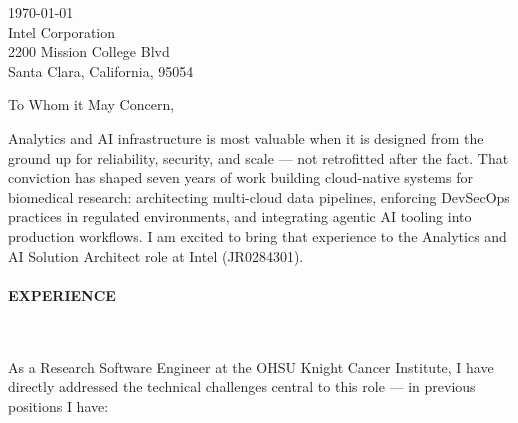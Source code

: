



\textcolor{my-grey}{\dotfill}
\bigbreak

{\today}\\
Intel Corporation\\
2200 Mission College Blvd\\
Santa Clara, California, 95054

\vspace*{2\baselineskip}

To Whom it May Concern,

\vspace*{\baselineskip}

Analytics and AI infrastructure is most valuable when it is designed from the ground up for reliability, security, and scale --- not retrofitted after the fact. That conviction has shaped seven years of work building cloud-native systems for biomedical research: architecting multi-cloud data pipelines, enforcing DevSecOps practices in regulated environments, and integrating agentic AI tooling into production workflows. I am excited to bring that experience to the Analytics and AI Solution Architect role at Intel (JR0284301).

\paragraph{EXPERIENCE}\

\vspace*{\baselineskip}

As a Research Software Engineer at the OHSU Knight Cancer Institute, I have directly addressed the technical challenges central to this role --- in previous positions I have:

